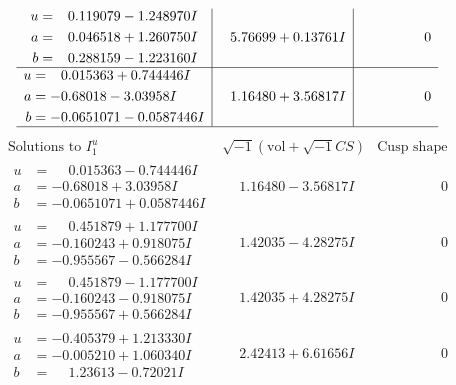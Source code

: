 \documentclass[1p]{elsarticle_modified}
\theoremstyle{definition}
\newcommand{\I}{\sqrt{-1}}
\begin{document}
$$\begin{array}{c|c|c}
\begin{aligned}
u &= \phantom{-}0.119079 - 1.248970 I \\
a &= \phantom{-}0.046518 + 1.260750 I \\
b &= \phantom{-}0.288159 - 1.223160 I\end{aligned}
 & \phantom{-}5.76699 + 0.13761 I & \phantom{-0.000000 } 0 \\ \hline\begin{aligned}
u &= \phantom{-}0.015363 + 0.744446 I \\
a &= -0.68018 - 3.03958 I \\
b &= -0.0651071 - 0.0587446 I\end{aligned}
 & \phantom{-}1.16480 + 3.56817 I & \phantom{-0.000000 } 0\\
 \hline 
 \end{array}$$\newpage$$\begin{array}{c|c|c}  
\text{Solutions to }I^u_{1}& \I (\text{vol} + \sqrt{-1}CS) & \text{Cusp shape}\\
 \hline 
\begin{aligned}
u &= \phantom{-}0.015363 - 0.744446 I \\
a &= -0.68018 + 3.03958 I \\
b &= -0.0651071 + 0.0587446 I\end{aligned}
 & \phantom{-}1.16480 - 3.56817 I & \phantom{-0.000000 } 0 \\ \hline\begin{aligned}
u &= \phantom{-}0.451879 + 1.177700 I \\
a &= -0.160243 + 0.918075 I \\
b &= -0.955567 - 0.566284 I\end{aligned}
 & \phantom{-}1.42035 - 4.28275 I & \phantom{-0.000000 } 0 \\ \hline\begin{aligned}
u &= \phantom{-}0.451879 - 1.177700 I \\
a &= -0.160243 - 0.918075 I \\
b &= -0.955567 + 0.566284 I\end{aligned}
 & \phantom{-}1.42035 + 4.28275 I & \phantom{-0.000000 } 0 \\ \hline\begin{aligned}
u &= -0.405379 + 1.213330 I \\
a &= -0.005210 + 1.060340 I \\
b &= \phantom{-}1.23613 - 0.72021 I\end{aligned}
 & \phantom{-}2.42413 + 6.61656 I & \phantom{-0.000000 } 0 \\ \hline\begin{aligned}

\end{aligned}
\end{array}$$
\end{document}
